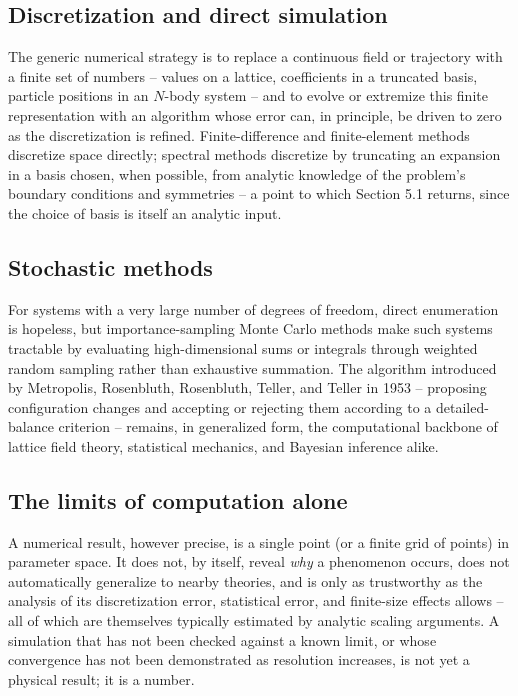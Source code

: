\subsection{Discretization and direct simulation}

The generic numerical strategy is to replace a continuous field or trajectory
with a finite set of numbers -- values on a lattice, coefficients in a
truncated basis, particle positions in an $N$-body system -- and to evolve or
extremize this finite representation with an algorithm whose error can, in
principle, be driven to zero as the discretization is refined.
Finite-difference and finite-element methods discretize space directly;
spectral methods discretize by truncating an expansion in a basis chosen, when
possible, from analytic knowledge of the problem's boundary conditions and
symmetries -- a point to which Section 5.1 returns, since the choice of basis
is itself an analytic input.

\subsection{Stochastic methods}

For systems with a very large number of degrees of freedom, direct enumeration
is hopeless, but importance-sampling Monte Carlo methods make such systems
tractable by evaluating high-dimensional sums or integrals through weighted
random sampling rather than exhaustive summation. The algorithm introduced by
Metropolis, Rosenbluth, Rosenbluth, Teller, and Teller in 1953
\cite{Metropolis1953} -- proposing configuration changes and accepting or
rejecting them according to a detailed-balance criterion -- remains, in
generalized form, the computational backbone of lattice field theory,
statistical mechanics, and Bayesian inference alike.

\subsection{The limits of computation alone}

A numerical result, however precise, is a single point (or a finite grid of
points) in parameter space. It does not, by itself, reveal \emph{why} a
phenomenon occurs, does not automatically generalize to nearby theories, and is
only as trustworthy as the analysis of its discretization error, statistical
error, and finite-size effects allows -- all of which are themselves typically
estimated by analytic scaling arguments. A simulation that has not been checked
against a known limit, or whose convergence has not been demonstrated as
resolution increases, is not yet a physical result; it is a number.

